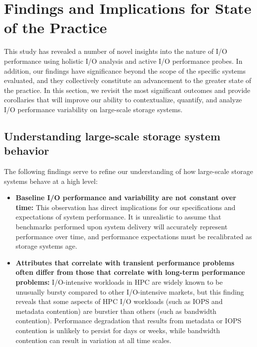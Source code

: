 \section{Findings and Implications for State of the Practice}
\label{sec:findings}


This study has revealed a number of novel insights into the nature of I/O performance using holistic I/O analysis and active I/O performance probes.
In addition, our findings have significance beyond the scope of the specific systems evaluated, and they collectively constitute an advancement to the greater state of the practice.
In this section, we revisit the most significant outcomes and provide corollaries that will improve our ability to contextualize, quantify, and analyze I/O performance variability on large-scale storage systems.

\subsection{Understanding large-scale storage system behavior}

The following findings serve to refine our understanding of how large-scale storage
systems behave at a high level: 

\begin{itemize}[leftmargin=*]

\item \textbf{Baseline I/O performance and variability are not constant over
time:} This observation has direct implications for our specifications and
expectations of system performance.  It is unrealistic to assume that
benchmarks performed upon system delivery will accurately represent
performance over time, and performance expectations must be recalibrated as storage systems age.

\item \textbf{Attributes that correlate with transient performance problems  often differ from those that correlate with
long-term performance problems:}  I/O-intensive workloads in HPC
are widely known to be unusually bursty compared to other I/O-intensive markets, but this finding reveals that some aspects of HPC I/O workloads (such as IOPS
and metadata contention) are burstier than others (such as bandwidth contention).  Performance degradation that results from metadata or IOPS contention is unlikely to persist for days or weeks, while bandwidth contention can result in variation at all time scales.

\end{itemize}


